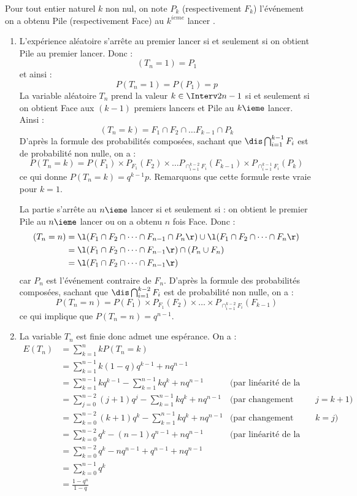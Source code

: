 \documentclass[a4paper,10pt]{report}
\begin{document}
\corr Pour tout entier naturel $k$ non nul, on note $P_k$ (respectivement $F_k$) l'événement \og on a obtenu Pile (respectivement Face) au $k^{ieme}$ lancer \fg.
\begin{enumerate}
\item  L'expérience aléatoire s'arrête au premier lancer si et seulement si on obtient \og Pile \fg au premier lancer. Donc : 
$$(T_n=1) = P_1$$
et ainsi :
\[ P(T_n=1) = P(P_1) = p\]
La variable aléatoire $T_n$ prend la valeur $k \in \Interv 2 {n-1} $ si et seulement si on obtient Face aux $(k-1)$ premiers lancers et Pile au $k\ieme$ lancer. Ainsi :
$$ (T_n = k) = F_1\cap F_2\cap \dots F_{k-1} \cap P_k$$
D'après la formule des probabilités composées, sachant que $\dis \bigcap_{i=1}^{k-1} F_i$ est de probabilité non nulle,  on a : 
$$ P(T_n=k) = P(F_1)\times P_{F_1}(F_2)\times \dots P_{\cap_{i=1}^{k-2} F_i}(F_{k-1}) \times P_{\cap_{i=1}^{k-1} F_i}(P_k)$$
ce qui donne $P(T_n=k) = q^{k-1}p$. Remarquons que cette formule reste vraie pour $k=1$.

\medskip

\noindent La partie s'arrête au $n\ieme$ lancer si et seulement si : \og on obtient le premier Pile au $n\ieme$ lancer \fg ou \og on a obtenu $n$ fois Face\fg. Donc :
\begin{align*}
(T_n=n) &= \l(F_1 \cap F_2 \cap \dots \cap F_{n-1} \cap P_n\r) \cup \l(F_1 \cap F_2 \cap \dots \cap F_{n} \r)\\
&= \l(F_1 \cap F_2 \cap \dots \cap F_{n-1}\r)\cap (P_n\cup F_n)\\
&=\l(F_1 \cap F_2 \cap \dots \cap F_{n-1}\r)
\end{align*}
car $P_n$ est l'événement contraire de $F_n$. D'après la formule des probabilités composées, sachant que $\dis \bigcap_{i=1}^{k-2} F_i$ est de probabilité non nulle, on a :
$$P(T_n=n) = P(F_1)\times P_{F_1}(F_2)\times \dots \times P_{\cap_{i=1}^{k-2} F_i}(F_{k-1}) $$
ce qui implique que $P(T_n=n) = q^{n-1}$.

\item La variable $T_n$ est finie donc admet une espérance. On a :
\begin{align*}
 E(T_n) & = \sum_{k=1}^n k P(T_n=k) \\
 & = \sum_{k=1}^{n-1} k(1-q)q^{k-1} + n q^{n-1}\\
 & = \sum_{k=1}^{n-1} k q^{k-1} - \sum_{k=1}^{n-1} kq^{k} + n q^{n-1} & \text{(par linéarité de la somme)}\\
 & =  \sum_{j=0}^{n-2} (j+1)q^{j} - \sum_{k=1}^{n-1} kq^{k} + nq^{n-1} & \text{(par changement d'indice }j=k+1)\\
 & =  \sum_{k=0}^{n-2} (k+1)q^{k} - \sum_{k=1}^{n-1} kq^{k} + nq^{n-1} &\text{(par changement d'indice }k=j)\\
 & =  \sum_{k=0}^{n-2} q^k - (n-1)q^{n-1} + n q^{n-1} & \text{(par linéarité de la somme)}\\
 &=  \sum_{k=0}^{n-2} q^k - nq^{n-1} + q^{n-1} + n q^{n-1} \\
 &= \sum_{k=0}^{n-1} q^k \\
 & = \frac{1-q^n}{1-q}  
\end{align*}


\end{enumerate}
\end{document}
